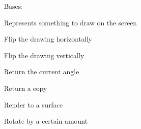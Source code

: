 \documentclass[letterpaper,10pt,english]{sphinxmanual}
\begin{document}
\begin{fulllineitems}
\label{visual:serge.visual.Drawing}
Bases: 

Represents something to draw on the screen

\begin{fulllineitems}
\label{visual:serge.visual.Drawing.flipHorizontal}
Flip the drawing horizontally

\end{fulllineitems}


\begin{fulllineitems}
\label{visual:serge.visual.Drawing.flipVertical}
Flip the drawing vertically

\end{fulllineitems}


\begin{fulllineitems}
\label{visual:serge.visual.Drawing.getAngle}
Return the current angle

\end{fulllineitems}


\begin{fulllineitems}
\label{visual:serge.visual.Drawing.getCopy}
Return a copy

\end{fulllineitems}


\begin{fulllineitems}
\label{visual:serge.visual.Drawing.renderTo}
Render to a surface

\end{fulllineitems}


\begin{fulllineitems}
\label{visual:serge.visual.Drawing.rotateBy}
Rotate by a certain amount


\end{fulllineitems}
\end{fulllineitems}
\end{document}
